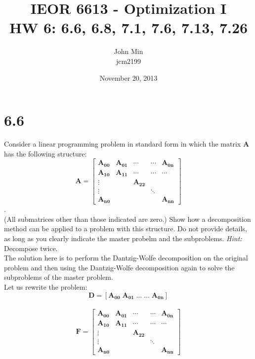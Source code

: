 \documentclass{article}
\begin{document}
\title{IEOR 6613 - Optimization I\\ HW 6:  6.6, 6.8, 7.1, 7.6, 7.13, 7.26}

\author{John Min\\ jcm2199}
\date{November 20, 2013}
\maketitle

\section*{6.6}
Consider a linear programming problem in standard form in which the matrix $\mathbf{A}$ has the following structure: \\
$$ \mathbf{A = } 
\begin{bmatrix} \mathbf{A_{00}} & \mathbf{A_{01}} & \cdots & \cdots & \mathbf{A_{0n}} \\
				\mathbf{A_{10}} & \mathbf{A_{11}} & \cdots & \cdots & \cdots	\\
				\vdots & & \mathbf{A_{22}} \\
				\vdots & & & \ddots \\
				\mathbf{A_{n0}} & & & & \mathbf{A_{nn}}
\end{bmatrix} $$. \\
(All submatrices other than those indicated are zero.)  Show how a decomposition method can be applied to a problem with this structure.  Do not provide details, as long as you clearly indicate the master probelm and the subproblems.  \emph{Hint:} Decompose twice. \\

\noindent
The solution here is to perform the Dantzig-Wolfe decomposition on the original problem and then using the Dantzig-Wolfe decomposition again to solve the subproblems of the master problem. \\

\noindent
Let us rewrite the problem:  \\

\noindent
$$\mathbf{D} = [\mathbf{A_{00}} \; \mathbf{A_{01}} \; \ldots \; \ldots \; \mathbf{A_{0n}} ]$$ \\ $$\mathbf{F = } \begin{bmatrix} \mathbf{A_{00}} & \mathbf{A_{01}} & \cdots & \cdots & \mathbf{A_{0n}} \\
				\mathbf{A_{10}} & \mathbf{A_{11}} & \cdots & \cdots & \cdots	\\
				\vdots & & \mathbf{A_{22}} \\
				\vdots & & & \ddots \\
				\mathbf{A_{n0}} & & & & \mathbf{A_{nn}}
\end{bmatrix} $$ \\
\end{document}
